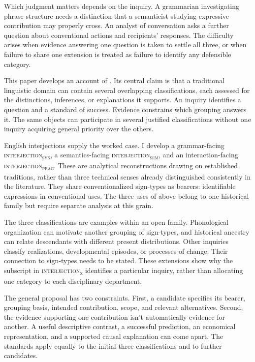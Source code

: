 \documentclass[12pt]{article}
\newcommand{\intj}[1]{\textsc{interjection\textsubscript{#1}}}
\begin{document}
Which judgment matters depends on the inquiry. A grammarian investigating
phrase structure needs a distinction that a semanticist studying expressive
contribution may properly cross. An analyst of conversation asks a further
question about conventional actions and recipients' responses. The difficulty
arises when evidence answering one question is taken to settle all three,
or when failure to share one extension is treated as failure to identify
any defensible category.

This paper develops an account of .
Its central claim is that a traditional linguistic domain can contain several
overlapping classifications, each assessed for the distinctions, inferences,
or explanations it supports. An inquiry identifies a question and a standard
of success. Evidence constrains which grouping answers it. The same objects
can participate in several justified classifications without one inquiry
acquiring general priority over the others.

English interjections supply the worked case. I develop a grammar-facing
\intj{syn}, a semantics-facing \intj{sem}, and an interaction-facing
\intj{prag}. These are analytical reconstructions drawing on established
traditions, rather than three technical senses already distinguished
consistently in the literature. They share conventionalized sign-types as
bearers: identifiable expressions in conventional uses. The three uses of
 above belong to one historical family but require separate
analysis at this grain.

The three classifications are examples within an open family. Phonological
organization can motivate another grouping of sign-types, and historical
ancestry can relate descendants with different present distributions. Other
inquiries classify realizations, developmental episodes, or processes of
change. Their connection to sign-types needs to be stated. These extensions
show why the subscript in \intj{x} identifies a particular inquiry, rather
than allocating one category to each disciplinary department.

The general proposal has two constraints. First, a candidate specifies its
bearer, grouping basis, intended contribution, scope, and relevant alternatives.
Second, the evidence supporting one contribution isn't automatically evidence
for another. A useful descriptive contrast, a successful prediction, an
economical representation, and a supported causal explanation can come apart.
The standards apply equally to the initial three classifications and to
further candidates.
\end{document}
